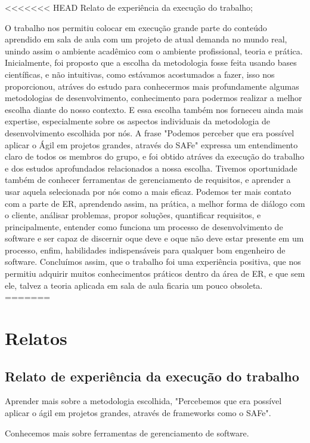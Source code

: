 <<<<<<< HEAD
Relato de experiência da execução do trabalho;

    O trabalho nos permitiu colocar em execução grande parte do conteúdo aprendido em sala de aula
com um projeto de atual demanda no mundo real, unindo assim o ambiente acadêmico com o ambiente profissional,
teoria e prática.
Inicialmente, foi proposto que a escolha da metodologia fosse feita usando bases científicas, e não
intuitivas, como estávamos acostumados a fazer, isso nos proporcionou, atráves do estudo para conhecermos
mais profundamente algumas metodologias de desenvolvimento, conhecimento para podermos realizar a melhor
escolha diante do nosso contexto. E essa escolha também nos forneceu ainda mais expertise,
especialmente sobre os aspectos individuais da metodologia de desenvolvimento escolhida por nós.
A frase "Podemos perceber que era possível aplicar o Ágil em projetos grandes, através do SAFe"
expressa um entendimento claro de todos os membros do grupo, e foi obtido atráves da execução do trabalho
e dos estudos aprofundados relacionados a nossa escolha.
    Tivemos oportunidade também de conhecer ferramentas de gerenciamento de requisitos, e aprender a usar
aquela selecionada por nós como a mais eficaz.
    Podemos ter mais contato com a parte de ER, aprendendo assim, na prática, a melhor forma de diálogo
com o cliente, análisar problemas, propor soluções, quantificar requisitos, e principalmente,
entender como funciona um processo de desenvolvimento de software e ser capaz de discernir oque deve
e oque não deve estar presente em um processo, enfim, habilidades indispensáveis
para qualquer bom engenheiro de software.
    Concluímos assim, que o trabalho foi uma experiência positiva, que nos permitiu adquirir muitos
conhecimentos práticos dentro da área de ER, e que sem ele, talvez a teoria aplicada em sala de aula
ficaria um pouco obsoleta.
=======
\chapter{Relatos}

\section{Relato de experiência da execução do trabalho}
  Aprender mais sobre a metodologia escolhida, "Percebemos que era possível aplicar o ágil em projetos grandes, através de frameworks como o SAFe".

  Conhecemos mais sobre ferramentas de gerenciamento de software.

